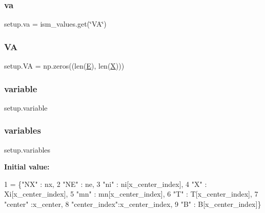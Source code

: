 \subsubsection{\texorpdfstring{va}{va}}
{\footnotesize\ttfamily setup.\+va = ism\+\_\+values.\+get(\char`\"{}VA\char`\"{})}

\mbox{\label{namespacesetup_ae3ede6148b96533519002e1388760dd1}} 
\subsubsection{\texorpdfstring{VA}{VA}}
{\footnotesize\ttfamily setup.\+VA = np.\+zeros((len(\hyperlink{namespacesetup_a8bf3113e27e2925ec3309507c6d5ebf2}{E}), len(\hyperlink{namespacesetup_a0d71901ea06bb31a1b5e9e742158486f}{X})))}

\mbox{\label{namespacesetup_a3e426d7a0fddfef14385f639c07962a4}} 
\subsubsection{\texorpdfstring{variable}{variable}}
{\footnotesize\ttfamily setup.\+variable}

\mbox{\label{namespacesetup_a46c3d10a9b44fbab0c274bcaacba2bcf}} 
\subsubsection{\texorpdfstring{variables}{variables}}
{\footnotesize\ttfamily setup.\+variables}

{\bfseries Initial value\+:}
\begin{DoxyCode}
1 =  \{\textcolor{stringliteral}{"NX"}       : nx,
2              \textcolor{stringliteral}{"NE"}       : ne,
3              \textcolor{stringliteral}{"ni"}       : ni[x\_center\_index],
4              \textcolor{stringliteral}{"X"}        : Xi[x\_center\_index],
5              \textcolor{stringliteral}{"mn"}       : mn[x\_center\_index],
6              \textcolor{stringliteral}{"T"}        : T[x\_center\_index],
7              \textcolor{stringliteral}{"center"}   :x\_center,
8              \textcolor{stringliteral}{"center\_index"}:x\_center\_index,
9              \textcolor{stringliteral}{"B"}        : B[x\_center\_index]\}
\end{DoxyCode}
\mbox{\label{namespacesetup_a0d71901ea06bb31a1b5e9e742158486f}} 
